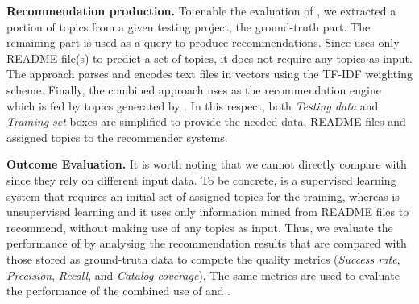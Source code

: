 \vspace{.1cm}
\noindent\textbf{Recommendation production.} To enable the evaluation of \TF, 
we extracted a portion of topics from a given testing project, \ie the 
ground-truth part. The remaining part is used as a query to produce 
recommendations. %
Since \MNB uses only README file(s) to predict a set of topics, it does not require any topics as input. The approach parses and encodes text files in vectors using the TF-IDF weighting scheme. 
Finally, the combined approach uses \TF as the recommendation engine which is fed by topics generated by \MNB. In this respect, both \textit{Testing data} and \textit{Training set} boxes are simplified to provide the needed data, \ie README files and assigned topics to the recommender systems.

\vspace{.1cm}
\noindent\textbf{Outcome Evaluation.} It is worth noting that we cannot 
directly compare \TF with \MNB since they 
rely on different input data. To be concrete, \TF is a supervised learning 
system that requires an initial set of assigned topics for the training, 
whereas \MNB is unsupervised learning and it uses only information mined from 
README files to recommend, without making use of any topics as input. Thus, we 
evaluate the performance of \TF by analysing the recommendation results that 
are compared with those stored as ground-truth data to compute the quality 
metrics (\ie \textit{Success rate}, \textit{Precision}, \textit{Recall}, and 
\textit{Catalog coverage}). The same metrics are used to evaluate the 
performance of the combined use of \TF and \MNB.



